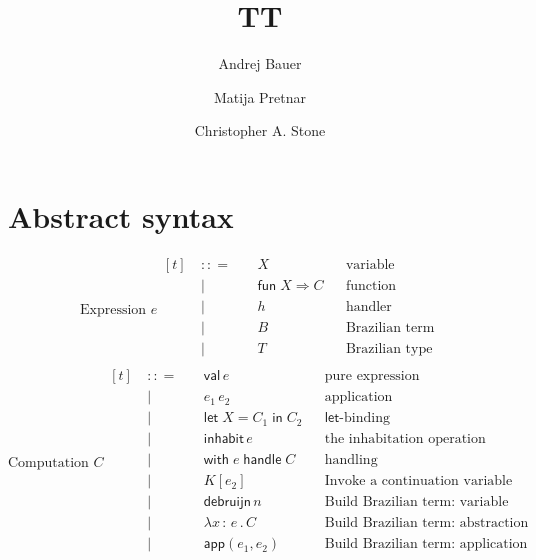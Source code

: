 \documentclass{article}
\newcommand{\bnf}{\ \mathrel{{:}{:}{=}}\ }
\newcommand{\bnfor}{\ \mid\ \ }
\newcommand{\x}{x}     %
\newcommand{\C}{C}     %
\newcommand{\K}{K}     %
\newcommand{\X}{X}     %
\newcommand{\e}{e}     %
\newcommand{\rgn}{r}   %
\newcommand{\T}{T}     %
\newcommand{\val}{\mathsf{val}\,} %
\newcommand{\letin}[1]{\mathsf{let}\; #1 \;\mathsf{in}\;} %
\newcommand{\inhabitOp}[1]{\mathsf{inhabit}\,#1} %
\newcommand{\withhandle}[1]{\mathsf{with}\;#1\;\mathsf{handle}\;} %
\newcommand{\abs}[1]{\mathsf{abs}\;#1\;\mathsf{in}\;} %
\newcommand{\new}[2]{\mathsf{new}(#1,#2)} %
\newcommand{\fun}[1]{\mathsf{fun}\;#1\Rightarrow} %
\newcommand{\app}[2]{#1\,#2} %
\newcommand{\lam}[2]{\lambda #1 \,{:}\, #2 \,.\,} %
\newcommand{\kapp}[2]{#1[#2]} %
\newcommand{\makeApp}[2]{\mathsf{app}(#1,#2)} %
\newcommand{\debruijn}[1]{\mathsf{debruijn}\,#1} %
\begin{document}
\title{TT}
\author{Andrej Bauer \and Matija Pretnar \and Christopher A. Stone}
\maketitle

\section{Abstract syntax}
\label{sec:abstract-syntax}

\begin{equation*}
  \text{Expression $\e$}
  \begin{aligned}[t]
    &\bnf   {} && \X          && \text{variable} \\
    &\bnfor {} && \fun{\X} \C  && \text{function} \\
    &\bnfor {} && h           && \text{handler} \\
    &\bnfor {} && B           && \text{Brazilian term} \\
    &\bnfor {} && T           && \text{Brazilian type} \\
  \end{aligned}
\end{equation*}
%
\begin{equation*}
  \text{Computation $\C$}
  \begin{aligned}[t]
    &\bnf   {} && \val \e                && \text{pure expression} \\
    &\bnfor {} && \app{\e_1}{\e_2}   && \text{application} \\
    &\bnfor {} && \letin{\X = \C_1} \C_2  && \text{$\mathsf{let}$-binding} \\
    &\bnfor {} && \inhabitOp{\e} && \text{the inhabitation operation} \\
    &\bnfor {} && \withhandle{\e} \C && \text{handling} \\
    &\bnfor {} && \kapp{\K}{\e_2}   && \text{Invoke a continuation variable} \\
    &\bnfor {} && \debruijn{n} && \text{Build Brazilian term: variable} \\
    &\bnfor {} && \lam{\x}{\e} \C   && \text{Build Brazilian term: abstraction} \\
    &\bnfor {} && \makeApp{\e_1}{\e_2} && \text{Build Brazilian term: application} \\
  \end{aligned}
\end{equation*}
\end{document}
